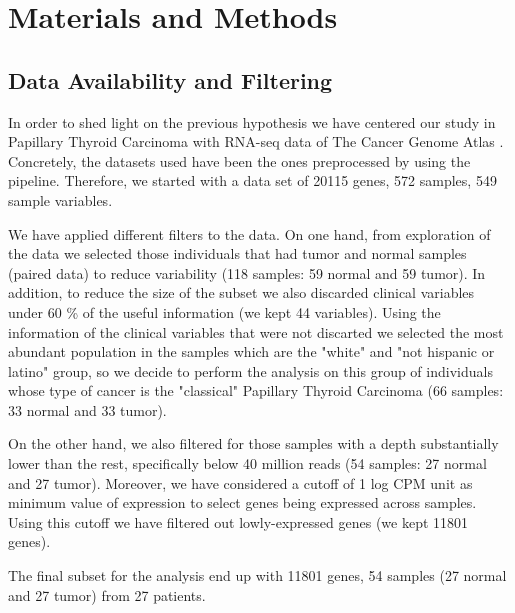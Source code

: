 \documentclass[9pt,twocolumn,twoside]{gsajnl}
\begin{document}
\section*{Materials and Methods}

\subsection*{Data Availability and Filtering}
In order to shed light on the previous hypothesis we have centered our study in Papillary Thyroid Carcinoma with RNA-seq data of The Cancer Genome Atlas \citep{tcga}. Concretely, the datasets used have been the ones preprocessed by \citet{Rahman2015} using the \citet{subread} pipeline. Therefore, we started with a data set of 20115 genes, 572 samples, 549 sample variables.

We have applied different filters to the data. On one hand, from exploration of the data we selected those individuals that had tumor and normal samples (paired data) to reduce variability (118 samples: 59 normal and 59 tumor). In addition, to reduce the size of the subset we also discarded clinical variables under 60 \% of the useful information (we kept 44 variables). Using the information of the clinical variables that were not discarted we selected the most abundant population in the samples which are the "white" and "not hispanic or latino" group, so we decide to perform the analysis on this group of individuals whose type of cancer is the "classical" Papillary Thyroid Carcinoma (66 samples: 33 normal and 33 tumor).

On the other hand,  we also filtered for those samples with a depth substantially lower than the rest, specifically below 40 million reads (54 samples: 27 normal and 27 tumor). Moreover, we have considered a cutoff of 1 log CPM unit as minimum value of expression to select genes being expressed across samples. Using this cutoff we have filtered out lowly-expressed genes (we kept 11801 genes). 

The final subset for the analysis end up with 11801 genes, 54 samples (27 normal and 27 tumor) from 27 patients.  
\end{document}

